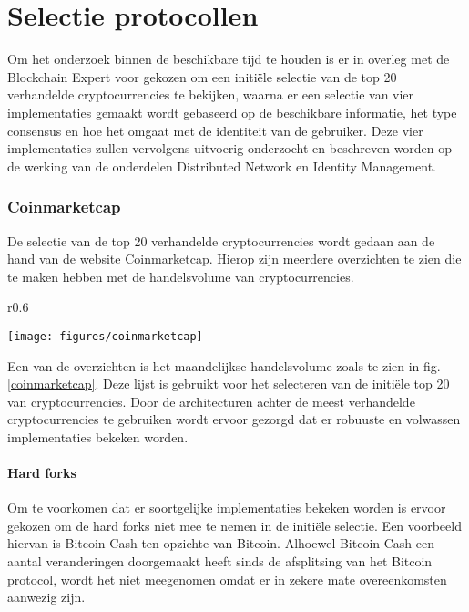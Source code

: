 \chapter{Selectie protocollen}
\label{selectie}

Om het onderzoek binnen de beschikbare tijd te houden is er in overleg met de Blockchain Expert voor gekozen om een initiële selectie van de top 20 verhandelde cryptocurrencies te bekijken, waarna er een selectie van vier implementaties gemaakt wordt gebaseerd op de beschikbare informatie, het type consensus en hoe het omgaat met de identiteit van de gebruiker. Deze vier implementaties zullen vervolgens uitvoerig onderzocht en beschreven worden op de werking van de onderdelen Distributed Network en Identity Management. 

\subsection{Coinmarketcap}

De selectie van de top 20 verhandelde cryptocurrencies wordt gedaan aan de hand van de website \href{https://coinmarketcap.com/}{Coinmarketcap}. Hierop zijn meerdere overzichten te zien die te maken hebben met de handelsvolume van cryptocurrencies.
\begin{wrapfigure}[17]{r}{0.6\textwidth}
  \begin{center}
    \texttt{[image: figures/coinmarketcap]}
    \caption[Snapshot Coinmarketcap] {
      Meest verhandelde cryptocurrencies in de maand februari zoals gepresenteerd op de website van Coinmarketcap.
    }
    \label{coinmarketcap}
  \end{center}
\end{wrapfigure}
Een van de overzichten is het maandelijkse handelsvolume zoals te zien in fig. \ref{coinmarketcap}. Deze lijst is gebruikt voor het selecteren van de initiële top 20 van cryptocurrencies. Door de architecturen achter de meest verhandelde cryptocurrencies te gebruiken wordt ervoor gezorgd dat er robuuste en volwassen implementaties bekeken worden.

\subsubsection{Hard forks}
Om te voorkomen dat er soortgelijke implementaties bekeken worden is ervoor gekozen om de hard forks niet mee te nemen in de initiële selectie. Een voorbeeld hiervan is Bitcoin Cash ten opzichte van Bitcoin. Alhoewel Bitcoin Cash een aantal veranderingen doorgemaakt heeft sinds de afsplitsing van het Bitcoin protocol, wordt het niet meegenomen omdat er in zekere mate overeenkomsten aanwezig zijn.

